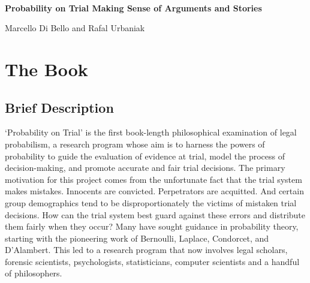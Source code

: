 \documentclass[
  10pt,
  dvipsnames,enabledeprecatedfontcommands]{scrartcl}
\author{}
\date{\vspace{-2.5em}}
\begin{document}
\begin{center}

$\, $

\vspace{-10mm}

\textbf{\huge  Probability on Trial \linebreak \normalsize  Making Sense of Arguments and Stories}
\vspace{1mm}

Marcello Di Bello and Rafal Urbaniak
\end{center}

\vspace{-6mm}

\hypertarget{the-book}{%
\section{The Book}\label{the-book}}

\vspace{-2mm}

\hypertarget{brief-description}{%
\subsection{Brief Description}\label{brief-description}}

\normalsize

`Probability on Trial' is the first book-length philosophical
examination of legal probabilism, a research program whose aim is to
harness the powers of probability to guide the evaluation of evidence at
trial, model the process of decision-making, and promote accurate and
fair trial decisions. The primary motivation for this project comes from
the unfortunate fact that the trial system makes mistakes. Innocents are
convicted. Perpetrators are acquitted. And certain group demographics
tend to be disproportionately the victims of mistaken trial decisions.
How can the trial system best guard against these errors and distribute
them fairly when they occur? Many have sought guidance in probability
theory, starting with the pioneering work of Bernoulli, Laplace,
Condorcet, and D'Alambert. This led to a research program that now
involves legal scholars, forensic scientists, psychologists,
statisticians, computer scientists and a handful of philosophers.
\end{document}

